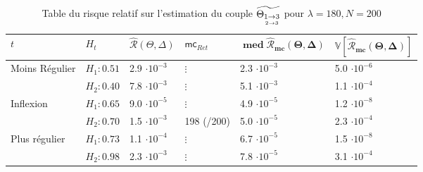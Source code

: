 \begin{table}[H]
	\centering
	\begin{tabularx}{\linewidth}{|X|X|XX|X|X|}
		\toprule
		$t$                                  & $H_t$        & $\widehat{\mathcal R}(\Theta, \Delta)$ & $\textsf{mc}_{Ret}$ & $\mathbf{\operatorname{med}\widehat{\mathcal R}_{mc}(\Theta, \Delta)}$ & $\mathbf{\mathds V[\widehat{\mathcal R}_{mc}(\Theta, \Delta)]}$ \\
		\midrule
		\multirow{2}{\hsize}{Moins Régulier} & $H_1 : 0.51$ & 2.9 $\cdot 10^{-3}$                    & $\vdots$            & 2.3 $\cdot 10^{-3}$                                                    & 5.0 $\cdot 10^{-6}$
		\\
		                                     & $H_2 : 0.40$ & 7.8 $\cdot 10^{-3}$                    & $\vdots$            & 5.1 $\cdot 10^{-3}$                                                    & 1.1 $\cdot 10^{-4}$
		\\
		\midrule
		\multirow{2}{\hsize}{Inflexion}      & $H_1 : 0.65$ & 9.0 $\cdot 10^{-5}$                    & $\vdots$            & 4.9 $\cdot 10^{-5}$                                                    & 1.2 $\cdot 10^{-8}$
		\\
		                                     & $H_2 : 0.70$ & 1.5 $\cdot 10^{-3}$                    & 198 (/200)          & 5.0 $\cdot 10^{-5}$                                                    & 2.3 $\cdot 10^{-4}$
		\\
		\midrule
		\multirow{2}{\hsize}{Plus régulier}  & $H_1 : 0.73$ & 1.1 $\cdot 10^{-4}$                    & $\vdots$            & 6.7 $\cdot 10^{-5}$                                                    & 1.5 $\cdot 10^{-8}$
		\\
		                                     & $H_2 : 0.98$ & 2.3 $\cdot 10^{-3}$                    & $\vdots$            & 7.8 $\cdot 10^{-5}$                                                    & 3.1 $\cdot 10^{-4}$
		\\
		\bottomrule
	\end{tabularx}
	\caption{Table du risque relatif sur l'estimation du couple $\widetilde{\Theta_{\underset{2 \rightarrow 3}{1 \rightarrow 3}}}$ pour $\lambda=180, N=200$}
\end{table}

\noindent{}

